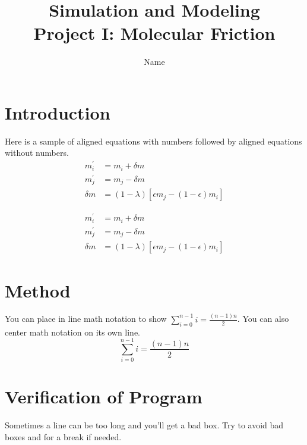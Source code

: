 \documentclass{article}%
\begin{document}
    \title{Simulation and Modeling\\Project I: Molecular Friction}
    \author{Name}
    \maketitle

    \twocolumn

    \section{Introduction}
    Here is a sample of aligned equations with numbers followed by aligned equations without numbers.
    \begin{align}
            m^{\prime}_i	&	= m_i + \delta m\\
            m^{\prime}_j	&	= m_j - \delta m\\
            \delta m 			&	= (1 - \lambda)[\epsilon m_j - (1 - \epsilon)m_i]
    \end{align}

    \begin{align*}
            m^{\prime}_i	&	= m_i + \delta m\\
            m^{\prime}_j	&	= m_j - \delta m\\
            \delta m 			&	= (1 - \lambda)[\epsilon m_j - (1 - \epsilon)m_i]
    \end{align*}

    \section{Method}
    You can place in line math notation to show $\sum^{n-1}_{i=0}{i} = \frac{(n-1)n}{2}$. You can also center math notation on its own line.
    $$\sum^{n-1}_{i=0}{i} = \frac{(n-1)n}{2}$$

    \section{Verification of Program}
    Sometimes a line can be too long and you'll get a bad box. Try to avoid bad boxes and for a break if needed.
\end{document}
